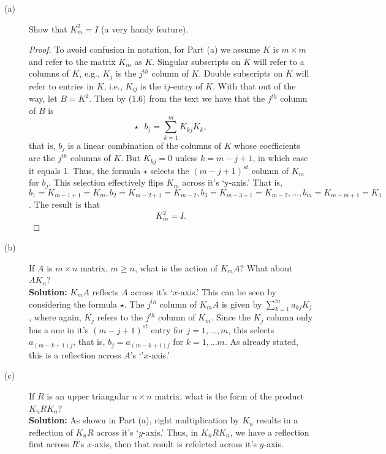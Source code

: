 \documentclass{article}
\begin{document}
\begin{description}
    \item[(a)] Show that $K_m^2 = I$ (a very handy feature).\\
    
    \begin{proof}
        To avoid confusion in notation, for Part (a) we assume $K$ is $m \times m$ and refer to the matrix $K_m$ as $K$. Singular subscripts on $K$ will refer to a columns of $K$, e.g., $K_j$ is the $j^{th}$ column of $K$. Double subscripts on $K$ will refer to entries in $K$, i.e., $K_{ij}$ is the $ij$-entry of $K$. With that out of the way, let $B = K^2$. Then by (1.6) from the text we have that the $j^{th}$ column of $B$ is \[\star ~~~ b_j = \sum_{k=1}^m K_{kj}K_k, \] that is, $b_j$ is a linear combination of the columns of $K$ whose coefficients are the $j^{th}$ columns of $K$. But $K_{kj} = 0$ unless $k=m-j+1$, in which case it equals 1. Thus,  the formula $\star$ selects the $(m-j+1)^{st}$ column of $K_m$ for $b_j$. This selection effectively flips $K_m$ across it's `y-axis.' That is, $b_1 = K_{m -1 + 1} = K_m, b_2 = K_{m-2 + 1} = K_{m-2}, b_3 = K_{m- 3 + 1} = K_{m-2}, \dots , b_m = K_{m - m + 1} = K_1$. The result is that \[K_m^2 = I.\]
    \end{proof}
    
    \item[(b)] If $A$ is $m\times n$ matrix, $m \geq n$, what is the action of $K_m A$? What about $AK_n$?\\
    
    \textbf{Solution:} $K_m A$ reflects $A$ across it's `$x$-axis.' This can be seen by considering the formula $\star$. The $j^{th}$ column of $K_mA$ is given by $\sum_{k=1}^m a_{kj}K_j$, where again, $K_j$ refers to the $j^{th}$ column of $K_m$. Since the $K_j$ column only has a one in it's $(m - j + 1)^{st}$ entry for $j = 1, \dots, m$, this selects $a_{(m-k+1)j}$, that is, $b_j = a_{(m-k + 1)j}$ for $k=1, \dots m$. As already stated, this is a reflection across $A$'s `'$x$-axis.' 

    \item[(c)] If $R$ is an upper triangular $n \times n$ matrix, what is the form of the product $K_nRK_n$?\\
    
    \textbf{Solution:} As shown in Part (a), right multiplication by $K_n$ results in a reflection of $K_nR$ across it's `$y$-axis.' Thus, in $K_nRK_n$, we have a reflection first across $R$'s $x$-axis, then that result is refelcted across it's $y$-axis.


\end{description}
\end{document}

